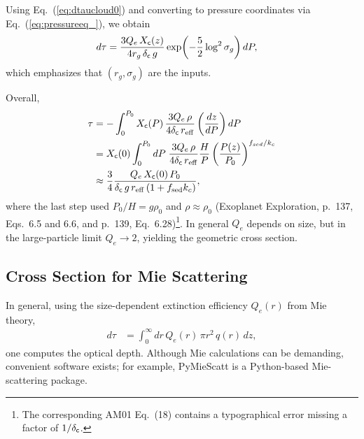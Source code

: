 Using Eq.~(\ref{eq:dtaucloud0}) and converting to pressure coordinates via Eq.~(\ref{eq:pressureeq_}), we obtain
\begin{align}
d \tau &=  \frac{3 Q_e\, X_{\mathsf{c}} (z)}{4 r_g\, \delta_{\mathsf{c}}\, g}  
\exp\!\left(- \frac{5}{2} \log^2{\sigma_g}\right) dP,
\end{align}
which emphasizes that $(r_g,\sigma_g)$ are the inputs.

Overall,
\begin{align}
\tau &= - \int_0^{P_0} X_{\mathsf{c}} (P)\, \frac{3  Q_e\, \rho}{4 \delta_{\mathsf{c}}\, r_\mathrm{eff}} 
\left( \frac{dz}{dP} \right) dP \\
&=  X_{\mathsf{c}} (0) \int_0^{P_0}  dP \; \frac{3 Q_e\, \rho}{4 \delta_{\mathsf{c}}\, r_\mathrm{eff}}  \frac{H}{P} 
\left( \frac{P(z)}{P_0} \right)^{f_{sed}/k_c}\\
&\approx   \frac{3}{4} \frac{ Q_e\, X_{\mathsf{c}}(0)\, P_0}{ \delta_{\mathsf{c}}\, g\, r_\mathrm{eff}\, (1 + f_\mathrm{sed} k_c) },
\end{align}
where the last step used $P_0/H = g \rho_0$ and $\rho \approx \rho_0$ (Exoplanet Exploration, p.~137, Eqs.~6.5 and 6.6, and p.~139, Eq.~6.28)\footnote{The corresponding AM01 Eq.~(18) contains a typographical error missing a factor of $1/\delta_{\mathsf{c}}$.}.  
In general $Q_e$ depends on size, but in the large-particle limit $Q_e \to 2$, yielding the geometric cross section.

\subsection*{Cross Section for Mie Scattering}

In general, using the size-dependent extinction efficiency $Q_e(r)$ from Mie theory,
\begin{align}
d \tau &= \int_0^\infty dr \, Q_e (r)\, \pi r^2\, q(r)\, dz,
\end{align}
one computes the optical depth.  
Although Mie calculations can be demanding, convenient software exists; for example, {\sf PyMieScatt} is a Python-based Mie-scattering package.
